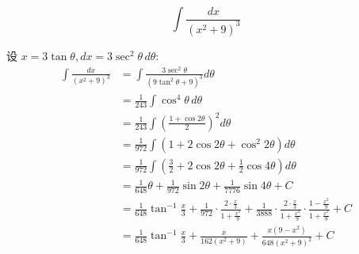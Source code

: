 \begin{questions}
    \question
    \[
    \int \frac{dx}{(x^2+9)^3}
    \]
    \begin{solution}
        设 $x = 3 \tan \theta, dx = 3 \sec^2 \theta \, d\theta$:
        \begin{align*}
        \int \frac{dx}{(x^2+9)^3}
        &= \int \frac{3 \sec^2 \theta}{(9 \tan^2 \theta + 9)^3} d\theta \\
        &= \frac{1}{243} \int \cos^4 \theta \, d\theta \\
        &= \frac{1}{243} \int \left( \frac{1 + \cos 2\theta}{2} \right)^2 d\theta \\
        &= \frac{1}{972} \int (1 + 2 \cos 2\theta + \cos^2 2\theta) d\theta \\
        &= \frac{1}{972} \int \left( \frac{3}{2} + 2 \cos 2\theta + \frac{1}{2} \cos 4\theta \right) d\theta \\
        &= \frac{1}{648} \theta + \frac{1}{972} \sin 2\theta + \frac{1}{7776} \sin 4\theta + C \\
        &= \frac{1}{648} \tan^{-1} \frac{x}{3} + \frac{1}{972} \cdot \frac{2\cdot \frac{x}{3}}{1+\frac{x^2}{9}} + \frac{1}{3888} \cdot \frac{2\cdot \frac{x}{3}}{1+\frac{x^2}{9}} \cdot \frac{1-\frac{x^2}{9}}{1+\frac{x^2}{9}} + C \\
        &= \frac{1}{648} \tan^{-1} \frac{x}{3} + \frac{x}{162(x^2+9)} + \frac{x(9-x^2)}{648(x^2+9)^2} + C
        \end{align*}
    \end{solution}


\end{questions}
